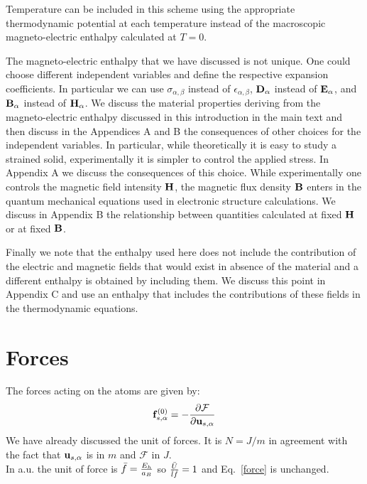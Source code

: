 \documentclass[12pt,a4paper]{article}
\begin{document}
Temperature can be included in this scheme using the appropriate
thermodynamic potential at each temperature instead of the macroscopic
magneto-electric enthalpy calculated at $T=0$. 

The magneto-electric enthalpy that we have discussed is not unique. One could 
choose different independent 
variables and define the respective expansion coefficients. In particular 
we can use $\sigma_{\alpha,\beta}$ instead of $\epsilon_{\alpha,\beta}$, 
${\bf D}_\alpha$ instead of ${\bf E}_\alpha$, and ${\bf B}_\alpha$ instead of
${\bf H}_\alpha$. 
We discuss the material properties deriving from the magneto-electric
enthalpy discussed in this introduction in the
main text and then discuss in the Appendices A and B the consequences 
of other choices for the independent variables.
In particular, while theoretically it is easy to study a strained solid,
experimentally it is simpler to control the applied stress. In Appendix A 
we discuss the consequences of this choice. 
While experimentally one controls the magnetic field intensity
${\bf H}$, the magnetic flux density ${\bf B}$ enters in the quantum
mechanical equations used in electronic structure calculations. 
We discuss in Appendix B the relationship between quantities 
calculated at fixed ${\bf H}$ or at fixed ${\bf B}$. 

Finally we note that the enthalpy used here does not include the contribution 
of the electric and magnetic fields that would exist in absence of the 
material and a different enthalpy is obtained by including them. 
We discuss this point in Appendix C and use an enthalpy that includes
the contributions of these fields in the thermodynamic equations.

\newpage
\section{\color{coral}Forces}
The forces acting on the atoms are given by:
\begin{equation}
{\bf f}^{(0)}_{s,\alpha}=-{\partial \mathcal{F} \over \partial {\bf u}_{s,\alpha}}
\label{force}
\end{equation}
We have already discussed the unit of forces. It is $N=J/m$ in agreement
with the fact that ${\bf u}_{s,\alpha}$ is in $m$ and $\mathcal{F}$ in $J$.
\\

{\color{web-blue} In a.u. the unit of force is 
$\bar f= {E_h \over a_B}$ so ${\bar U \over \bar l \bar f}=1$ and
Eq.~\ref{force} is unchanged.
}
\\
\end{document}
